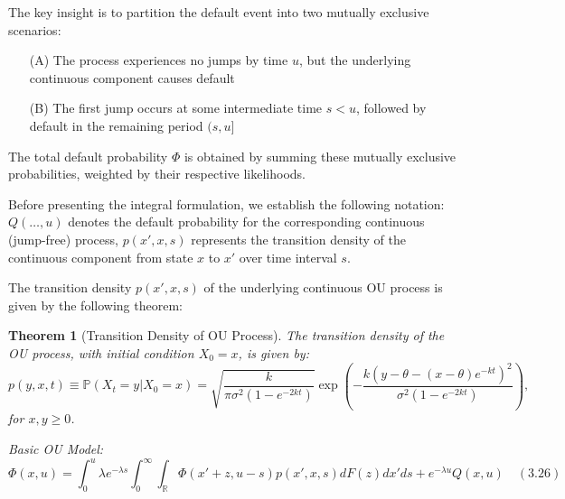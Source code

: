 \documentclass[11pt,twoside,openright]{report}
\newtheorem{theorem}{Theorem}[chapter]
\begin{document}
The key insight is to partition the default event into two mutually exclusive scenarios: 
\begin{enumerate}
    \item[(A)] The process experiences no jumps by time $u$, but the underlying continuous component causes default
    \item[(B)] The first jump occurs at some intermediate time $s < u$, followed by default in the remaining period $(s, u]$
\end{enumerate}

The total default probability $\Phi$ is obtained by summing these mutually exclusive probabilities, weighted by their respective likelihoods.

Before presenting the integral formulation, we establish the following notation: $Q(\dots, u)$ denotes the default probability for the corresponding continuous (jump-free) process, $p(x', x, s)$ represents the transition density of the continuous component from state $x$ to $x'$ over time interval $s$.

The transition density $p(x', x, s)$ of the underlying continuous OU process is given by the following theorem:

\begin{theorem}[Transition Density of OU Process]
The transition density of the OU process, with initial condition $X_0 = x$, is given by:
$$ p(y, x, t) \equiv \mathbb{P}(X_t = y | X_0 = x) = \sqrt{\frac{k}{\pi\sigma^2(1-e^{-2kt})}} \exp\left(-\frac{k(y - \theta - (x - \theta)e^{-kt})^2}{\sigma^2(1-e^{-2kt})}\right), $$
for $x, y \geq 0$.
\end{theorem}

\textit{Basic OU Model:}
$$ \Phi(x, u) = \int_0^u \lambda e^{-\lambda s} \int_0^\infty \int_{\mathbb{R}} \Phi(x' + z, u-s) p(x', x, s) dF(z) dx' ds + e^{-\lambda u} Q(x, u) \quad (3.26) $$
\end{document}
